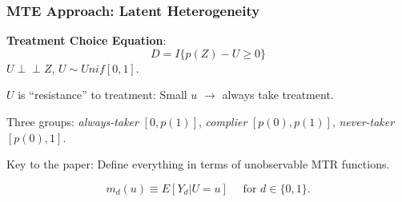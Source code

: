 \documentclass[11pt, aspectratio=169]{beamer}
\newcommand{\indep}{\perp\!\!\!\!\perp}
\begin{document}
\begin{frame}
    \frametitle{MTE Approach: Latent Heterogeneity}

    \textbf{Treatment Choice Equation}:
    \begin{equation*}
        D = I\{p(Z) - U \geq 0\}
    \end{equation*}
    $U\indep Z$, $U\sim Unif[0,1]$.

    \vspace{0.5cm}

    $U$ is ``resistance'' to treatment: Small $u$ $\rightarrow$ always take treatment.

    \vspace{0.5cm}

    Three groups: \textit{always-taker} $[0, p(1)]$, \textit{complier} $[p(0), p(1)]$, \textit{never-taker} $[p(0), 1]$.

    \vspace{0.5cm}
    \pause
    Key to the paper: Define everything in terms of unobservable MTR functions.

    \begin{equation*}
        m_d(u) \equiv E[Y_d | U=u] \quad \text{ for } d\in\{0, 1\}.
    \end{equation*}

\end{frame}




\end{document}
